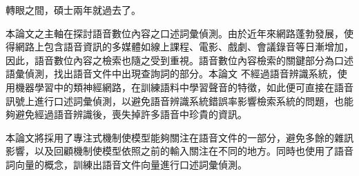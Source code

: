 \NTUtitlepage  %

\newpage
\setcounter{page}{1}

\NTUoralpage  %

\mydoublespacing
\begin{acknowledgement} %
轉眼之間，碩士兩年就過去了。
\end{acknowledgement}

\begin{zhAbstract}  %
本論文之主軸在探討語音數位內容之口述詞彙偵測。由於近年來網路蓬勃發展，使得網路上包含語音資訊的多媒體如線上課程、電影、戲劇、會議錄音等日漸增加，因此，語音數位內容之檢索也隨之受到重視。語音數位內容檢索的關鍵部分為口述語彙偵測，找出語音文件中出現查詢詞的部分。本論文
不經過語音辨識系統，使用機器學習中的類神經網路，在訓練語料中學習聲音的特徵，如此便可直接在語音訊號上進行口述詞彙偵測，以避免語音辨識系統錯誤率影響檢索系統的問題，也能夠避免經過語音辨識後，喪失掉許多語音中珍貴的資訊。

本論文將採用了專注式機制使模型能夠關注在語音文件的一部分，避免多餘的雜訊影響，以及回顧機制使模型依照之前的輸入關注在不同的地方。同時也使用了語音詞向量的概念，訓練出語音文件向量進行口述詞彙偵測。
\end{zhAbstract}

{
\mysinglespacing\selectfont
\tableofcontents %

\listoffigures  %

\listoftables  %
\par
}

\newpage
\setcounter{page}{1}
